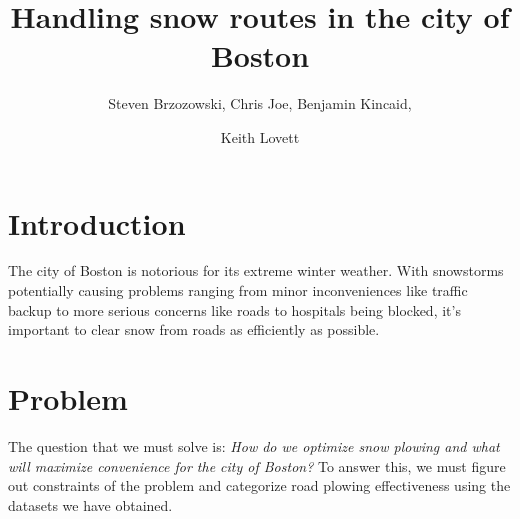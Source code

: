 \documentclass[15pt]{report}
\begin{document}

\title{Handling snow routes in the city of Boston} %




\author{Steven Brzozowski,
Chris Joe,
Benjamin Kincaid,
\and
Keith Lovett}
\maketitle


\section*{Introduction}
The city of Boston is notorious for its extreme winter weather. With snowstorms potentially causing problems ranging from minor inconveniences like traffic backup to more serious concerns like roads to hospitals being blocked, it's important to clear snow from roads as efficiently as possible. 

\section*{Problem}
The question that we must solve is: \textit{How do we optimize snow plowing and what will maximize convenience for the city of Boston?} To answer this, we must figure out constraints of the problem and categorize road plowing effectiveness using the datasets we have obtained.
\end{document}
